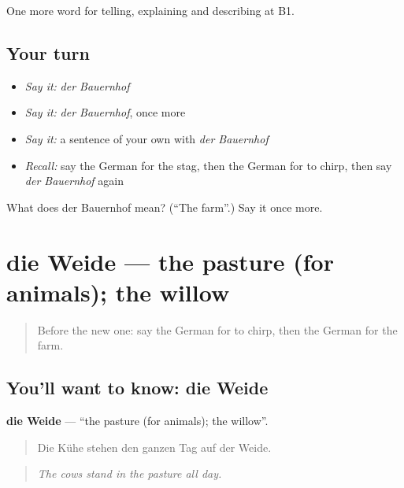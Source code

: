 \begin{grammarlens}[title={What you've built}]
One more word for telling, explaining and describing at B1.
\end{grammarlens}

\subsection*{Your turn}
\begin{itemize}
\raggedright
  \item \emph{Say it:} \emph{der Bauernhof}
  \item \emph{Say it:} \emph{der Bauernhof}, once more
  \item \emph{Say it:} a sentence of your own with \emph{der Bauernhof}
  \item \emph{Recall:} say the German for the stag, then the German for to chirp, then say \emph{der Bauernhof} again
\end{itemize}

\begin{tcolorbox}[breakable,colback=teal!4,colframe=teal!35!black,title={Before you move on}]
What does der Bauernhof mean? (\textquotedblleft{}The farm\textquotedblright{}.) Say it once more.
\end{tcolorbox}
\section[die Weide]{die Weide — the pasture (for animals); the willow}

\label{lesson:GE-C459-weide}



\begin{quote}
Before the new one: say the German for to chirp, then the German for the farm.
\end{quote}

\subsection*{You'll want to know: die Weide}
\textbf{die Weide} — \textquotedblleft{}the pasture (for animals); the willow\textquotedblright{}.

\begin{quote}
Die Kühe stehen den ganzen Tag auf der Weide.
\end{quote}

\begin{quote}
\emph{The cows stand in the pasture all day.}
\end{quote}

